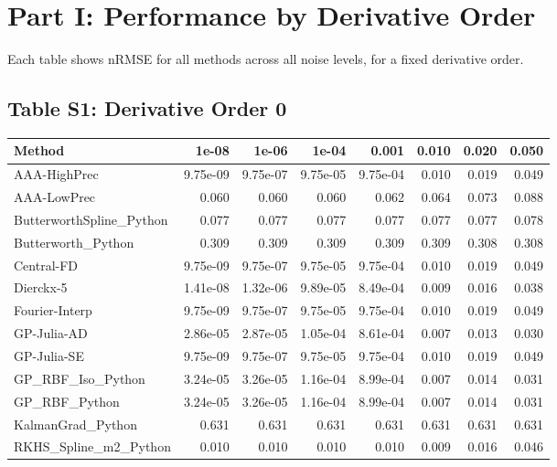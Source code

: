 \documentclass[10pt]{article}
\begin{document}
\section{Part I: Performance by Derivative Order}

Each table shows nRMSE for all methods across all noise levels, for a fixed derivative order.


\subsection*{Table S1: Derivative Order 0}

\begin{longtable}{lrrrrrrr}
\toprule
\textbf{Method} & \textbf{1e-08} & \textbf{1e-06} & \textbf{1e-04} & \textbf{0.001} & \textbf{0.010} & \textbf{0.020} & \textbf{0.050} \\
\midrule
\endhead
AAA-HighPrec & 9.75e-09 & 9.75e-07 & 9.75e-05 & 9.75e-04 & 0.010 & 0.019 & 0.049 \\
AAA-LowPrec & 0.060 & 0.060 & 0.060 & 0.062 & 0.064 & 0.073 & 0.088 \\
ButterworthSpline\_Python & 0.077 & 0.077 & 0.077 & 0.077 & 0.077 & 0.077 & 0.078 \\
Butterworth\_Python & 0.309 & 0.309 & 0.309 & 0.309 & 0.309 & 0.308 & 0.308 \\
Central-FD & 9.75e-09 & 9.75e-07 & 9.75e-05 & 9.75e-04 & 0.010 & 0.019 & 0.049 \\
Dierckx-5 & 1.41e-08 & 1.32e-06 & 9.89e-05 & 8.49e-04 & 0.009 & 0.016 & 0.038 \\
Fourier-Interp & 9.75e-09 & 9.75e-07 & 9.75e-05 & 9.75e-04 & 0.010 & 0.019 & 0.049 \\
GP-Julia-AD & 2.86e-05 & 2.87e-05 & 1.05e-04 & 8.61e-04 & 0.007 & 0.013 & 0.030 \\
GP-Julia-SE & 9.75e-09 & 9.75e-07 & 9.75e-05 & 9.75e-04 & 0.010 & 0.019 & 0.049 \\
GP\_RBF\_Iso\_Python & 3.24e-05 & 3.26e-05 & 1.16e-04 & 8.99e-04 & 0.007 & 0.014 & 0.031 \\
GP\_RBF\_Python & 3.24e-05 & 3.26e-05 & 1.16e-04 & 8.99e-04 & 0.007 & 0.014 & 0.031 \\
KalmanGrad\_Python & 0.631 & 0.631 & 0.631 & 0.631 & 0.631 & 0.631 & 0.631 \\
RKHS\_Spline\_m2\_Python & 0.010 & 0.010 & 0.010 & 0.010 & 0.009 & 0.016 & 0.046 \\

\end{longtable}
\end{document}
